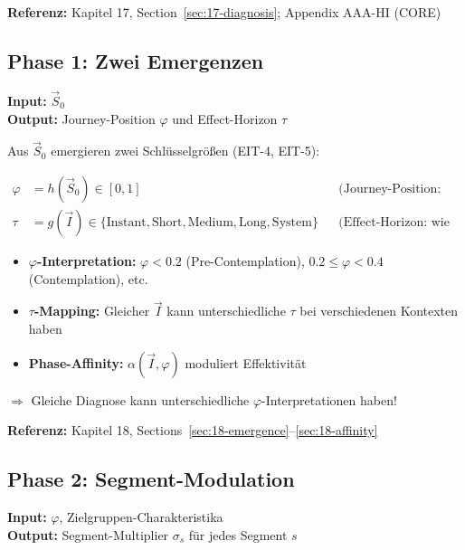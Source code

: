 \textbf{Referenz:} Kapitel 17, Section~\ref{sec:17-diagnosis}; Appendix AAA-HI (CORE)

\subsection{Phase 1: Zwei Emergenzen}
\label{sec:20-phase1}

\textbf{Input:} $\vec{S}_0$\\
\textbf{Output:} Journey-Position $\varphi$ und Effect-Horizon $\tau$

Aus $\vec{S}_0$ emergieren zwei Schlüsselgrößen (EIT-4, EIT-5):

\begin{align}
\varphi &= h(\vec{S}_0) \in [0,1] && \text{(Journey-Position: wo steht die Zielgruppe?)} \\
\tau &= g(\vec{I}) \in \{\text{Instant}, \text{Short}, \text{Medium}, \text{Long}, \text{System}\} && \text{(Effect-Horizon: wie schnell wirken Interventionen?)}
\end{align}

\begin{tcolorbox}[colback=orange!5!white, colframe=orange!75!black,
    title=\textbf{Variabilität in Phase 1}]
\begin{itemize}[nosep]
\item \textbf{$\varphi$-Interpretation:} $\varphi < 0.2$ (Pre-Contemplation), $0.2 \leq \varphi < 0.4$ (Contemplation), etc.
\item \textbf{$\tau$-Mapping:} Gleicher $\vec{I}$ kann unterschiedliche $\tau$ bei verschiedenen Kontexten haben
\item \textbf{Phase-Affinity:} $\alpha(\vec{I}, \varphi)$ moduliert Effektivität
\end{itemize}
$\Rightarrow$ Gleiche Diagnose kann unterschiedliche $\varphi$-Interpretationen haben!
\end{tcolorbox}

\textbf{Referenz:} Kapitel 18, Sections~\ref{sec:18-emergence}--\ref{sec:18-affinity}

\subsection{Phase 2: Segment-Modulation}
\label{sec:20-phase2}

\textbf{Input:} $\varphi$, Zielgruppen-Charakteristika\\
\textbf{Output:} Segment-Multiplier $\sigma_s$ für jedes Segment $s$

